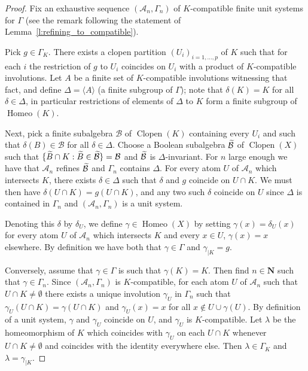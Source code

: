 \documentclass[AHL,Unicode]{cedram}
\DeclareMathOperator{\Homeo}{Homeo}
\DeclareMathOperator{\Clopen}{Clopen}
\newcommand{\N}{\mathbf{N}}
\newcommand{\mcA}{\mathcal{A}}
\newcommand{\mcB}{\mathcal{B}}
\let\oldtilde\tilde
\renewcommand*{\tilde}[1]{\mathchoice{\widetilde{#1}}{\widetilde{#1}}{\oldtilde{#1}}{\oldtilde{#1}}}
\begin{document}
\begin{proof}
Fix an exhaustive sequence $(\mcA_n,\Gamma_n)$ of $K$-compatible finite unit systems for $\Gamma$ (see the remark following the statement of Lemma~\ref{l:refining_to_compatible}).

Pick $g \in \Gamma_K$. There exists a clopen partition $(U_i)_{i=1,\dots,p}$ of $K$ such that for each $i$ the restriction of $g$ to $U_i$ coincides on $U_i$ with a product of $K$-compatible involutions. Let $A$ be a finite set of $K$-compatible involutions witnessing that fact, and define $\Delta=\langle A\rangle$ (a finite subgroup of $\Gamma$); note that $\delta(K)=K$ for all $\delta \in \Delta$, in particular restrictions of elements of $\Delta$ to $K$ form a finite subgroup of $\Homeo(K)$.

Next, pick a finite subalgebra $\mcB$ of $\Clopen(K)$ containing every $U_i$ and such that $\delta(B) \in \mcB$ for all $\delta \in \Delta$. Choose a Boolean subalgebra $\tilde \mcB$ of $\Clopen(X)$ such that $\{ \tilde B \cap K : \tilde B \in \tilde \mcB \}=\mcB$ and $\tilde \mcB$ is $\Delta$-invariant. For $n$ large enough we have that $\mcA_n$ refines $\tilde \mcB$ and $\Gamma_n$ contains $\Delta$. For every atom $U$ of $\mcA_n$ which intersects $K$, there exists $\delta \in \Delta$ such that $\delta$ and $g$ coincide on $U \cap K$. We must then have $\delta(U \cap K)= g(U \cap K)$, and any two such $\delta$ coincide on $U$ since $\Delta$ is contained in $\Gamma_n$ and $(\mcA_n,\Gamma_n)$ is a unit system.

Denoting this $\delta$ by $\delta_U$, we define $\gamma \in \Homeo(X)$ by setting $\gamma(x)=\delta_U(x)$ for every atom $U$ of $\mcA_n$ which intersects $K$ and every $x \in U$, $\gamma(x)=x$ elsewhere. By definition we have both that $\gamma \in \Gamma$ and $\gamma_{|K}=g$.

Conversely, assume that $\gamma \in \Gamma$ is such that $\gamma(K)=K$. Then find $n \in \N$ such that $\gamma \in \Gamma_n$. Since $(\mcA_n,\Gamma_n)$ is $K$-compatible, for each atom $U$ of $\mcA_n$ such that $U \cap K \ne \emptyset$ there exists a unique involution $\gamma_U$ in $\Gamma_n$ such that $\gamma_U(U \cap K)= \gamma(U \cap K)$ and $\gamma_U(x)=x$ for all $x \not \in U \cup \gamma(U)$. By definition of a unit system, $\gamma$ and $\gamma_U$ coincide on $U$, and $\gamma_U$ is $K$-compatible. Let $\lambda$ be the homeomorphism of $K$ which coincides with $\gamma_U$ on each $U \cap K$ whenever $U \cap K \ne \emptyset$ and coincides with the identity everywhere else. Then $\lambda \in \Gamma_K$ and $\lambda=\gamma_{|K}$.
\end{proof}
\end{document}
